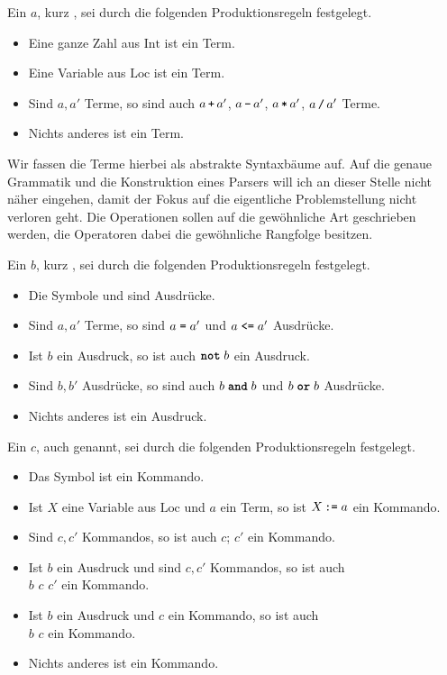 Ein  $a$, kurz , sei durch die
folgenden Produktionsregeln festgelegt.
\begin{itemize}[nosep]
\item Eine ganze Zahl aus $\mathrm{Int}$ ist ein Term.
\item Eine Variable aus $\mathrm{Loc}$ ist ein Term.
\item Sind $a,a'$ Terme, so sind auch $a\,\texttt{+}\,a'$, $a\,\texttt{-}\,a'$,
  $a\,\texttt{*}\,a'$, $a\,\texttt{/}\,a'$ Terme.
\item Nichts anderes ist ein Term.
\end{itemize}
Wir fassen die Terme hierbei als abstrakte Syntaxbäume auf.
Auf die genaue Grammatik und die Konstruktion eines Parsers will ich
an dieser Stelle nicht näher eingehen, damit der Fokus auf die
eigentliche Problemstellung nicht verloren geht. Die Operationen sollen
auf die gewöhnliche Art geschrieben werden, die Operatoren dabei die
gewöhnliche Rangfolge besitzen.

Ein  $b$, kurz , sei durch
die folgenden Produktionsregeln festgelegt.
\begin{itemize}[nosep]
\item Die Symbole  und  sind Ausdrücke.
\item Sind $a,a'$ Terme, so sind $a\;\texttt{=}\;a'$ und $a \;\texttt{<=}\; a'$ Ausdrücke.
\item Ist $b$ ein Ausdruck, so ist auch $\kw{not}\;b$ ein Ausdruck.
\item Sind $b,b'$ Ausdrücke, so sind auch $b\;\kw{and}\;b$ und $b\;\kw{or}\;b$ Ausdrücke.
\item Nichts anderes ist ein Ausdruck.
\end{itemize}

Ein  $c$, auch  genannt, sei durch die
folgenden Produktionsregeln festgelegt.
\begin{itemize}[nosep]
\item Das Symbol  ist ein Kommando.
\item Ist $X$ eine Variable aus $\mathrm{Loc}$ und $a$ ein Term,
  so ist $X\,\texttt{:=}\;a$ ein Kommando.
\item Sind $c,c'$ Kommandos, so ist auch $c$; $c'$ ein Kommando.
\item Ist $b$ ein Ausdruck und sind $c,c'$ Kommandos, so ist auch\\
   $b$  $c$  $c'$  ein Kommando.
\item Ist $b$ ein Ausdruck und $c$ ein Kommando, so ist auch\\
   $b$  $c$  ein Kommando.
\item Nichts anderes ist ein Kommando.
\end{itemize}

